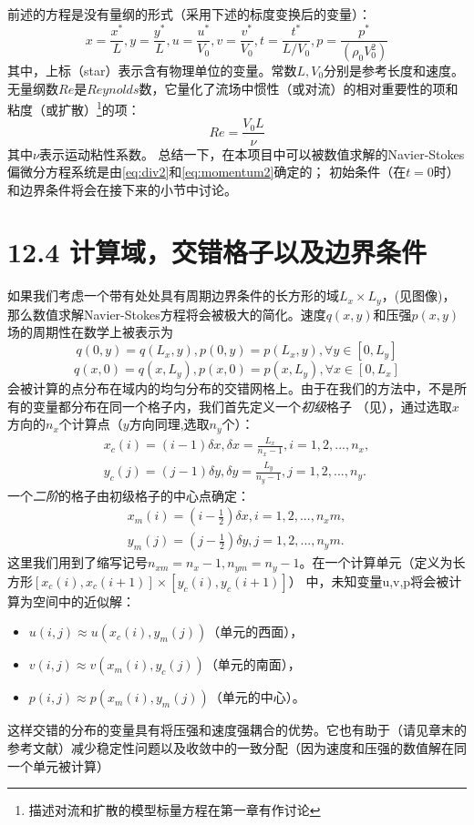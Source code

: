 \documentclass[nofonts]{ctexart} %
\begin{document}
前述的方程是没有量纲的形式（采用下述的标度变换后的变量）：
\begin{equation}
x=\frac{x^*}{L},y=\frac{y^*}{L},u=\frac{u^*}{V_0},v=\frac{v^*}{V_0},t=\frac{t^*}{L/V_0}, p=\frac{p^*}{(\rho_0 V_0^2)}
    
\end{equation}
其中，上标（star）表示含有物理单位的变量。常数$L,V_0$分别是参考长度和速度。无量纲数$Re$是$Reynolds$数，它量化了流场中惯性（或对流）的相对重要性的项和粘度（或扩散）\footnote{描述对流和扩散的模型标量方程在第一章有作讨论}的项：
\begin{equation}
Re=\frac{V_0 L}{\nu}    
\end{equation}
其中$\nu$表示运动粘性系数。
总结一下，在本项目中可以被数值求解的Navier-Stokes偏微分方程系统是由\ref{eq:div2}和\ref{eq:momentum2}确定的；
初始条件（在$t=0$时）和边界条件将会在接下来的小节中讨论。
\section{12.4 计算域，交错格子以及边界条件}
如果我们考虑一个带有处处具有周期边界条件的长方形的域$L_x \times L_y$，(见图像)，那么数值求解Navier-Stokes方程将会被极大的简化。速度$q(x,y)$和压强$p(x,y)$场的周期性在数学上被表示为
\begin{equation}
q(0,y)=q(L_x,y),p(0,y)=p(L_x,y), \forall y\in [0,L_y]
\end{equation}
\begin{equation}
q(x,0)=q(x,L_y),p(x,0)=p(x,L_y), \forall x\in [0,L_x]
\end{equation}
会被计算的点分布在域内的均匀分布的交错网格上。由于在我们的方法中，不是所有的变量都分布在同一个格子内，我们首先定义一个\textit{初级}格子
（见），通过选取$x$方向的$n_x$个计算点（$y$方向同理,选取$n_y$个）：
\begin{align}
    x_c(i)=(i-1)\delta x, \delta x=\frac{L_x}{n_x-1}, i=1,2,...,n_x,\\
    y_c(j)=(j-1)\delta y, \delta y=\frac{L_y}{n_y-1}, j=1,2,...,n_y.
\end{align}
一个\textit{二阶}的格子由初级格子的中心点确定：
\begin{align}
    x_m(i)=(i-\frac{1}{2})\delta x, i=1,2,...,n_xm,\\
    y_m(j)=(j-\frac{1}{2})\delta y, j=1,2,...,n_ym.
\end{align}
这里我们用到了缩写记号$n_{xm}=n_x-1,n_{ym}=n_y-1$。在一个计算单元（定义为长方形$[x_c(i),x_c(i+1)]\times[y_c(i),y_c(i+1)]$）
中，未知变量u,v,p将会被计算为空间中的近似解：
\begin{itemize}
    \item $u(i,j)\approx u(x_c(i),y_m(j)) $（单元的西面），
    \item  $v(i,j)\approx v(x_m(i),y_c(j))$（单元的南面），
    \item  $p(i,j)\approx p(x_m(i),y_m(j))$（单元的中心）。
\end{itemize}
这样交错的分布的变量具有将压强和速度强耦合的优势。它也有助于（请见章末的参考文献）减少稳定性问题以及收敛中的一致分配（因为速度和压强的数值解在同一个单元被计算）
\end{document}
